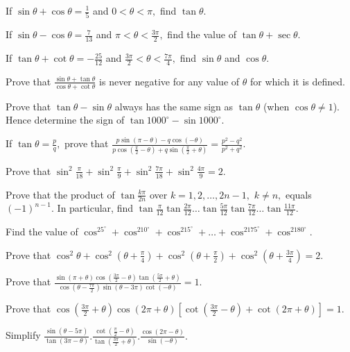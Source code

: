 \item If $\sin\theta + \cos\theta = \frac{1}{5}$ and $0 < \theta < \pi,$ find $\tan\theta.$
\item If $\sin\theta - \cos\theta = \frac{7}{13}$ and $\pi < \theta < \frac{3\pi}{2},$ find the value of $\tan\theta +
  \sec\theta.$
\item If $\tan\theta + \cot\theta = -\frac{25}{12}$ and $\frac{3\pi}{2} < \theta < \frac{7\pi}{4},$ find $\sin\theta$ and
  $\cos\theta.$
\item Prove that $\frac{\sin\theta + \tan\theta}{\cos\theta + \cot\theta}$ is never negative for any value of $\theta$ for which
  it is defined.
\item Prove that $\tan\theta - \sin\theta$ always has the same sign as $\tan\theta$ (when $\cos\theta \neq 1$). Hence determine
  the sign of $\tan 1000^\circ - \sin 1000^\circ.$
\item If $\tan\theta = \frac{p}{q},$ prove that $\frac{p\sin(\pi - \theta) - q\cos(-\theta)}{p\cos\left(\frac{\pi}{2} -
    \theta\right) + q\sin\left(\frac{\pi}{2} + \theta\right)} = \frac{p^2 - q^2}{p^2 + q^2}.$
\item Prove that $\sin^2\frac{\pi}{18} + \sin^2\frac{\pi}{9} + \sin^2\frac{7\pi}{18} + \sin^2\frac{4\pi}{9} = 2.$
\item Prove that the product of $\tan\frac{k\pi}{2n}$ over $k = 1, 2, \ldots, 2n - 1,$ $k \neq n,$ equals $(-1)^{n - 1}.$ In
  particular, find $\tan\frac{\pi}{12}\tan\frac{2\pi}{12}\ldots\tan\frac{5\pi}{12}\tan\frac{7\pi}{12}\ldots\tan\frac{11\pi}{12}.$
\item Find the value of $\cos^25^\circ + \cos^210^\circ + \cos^215^\circ + \ldots + \cos^2175^\circ + \cos^2180^\circ.$
\item Prove that $\cos^2\theta + \cos^2\left(\theta + \frac{\pi}{4}\right) + \cos^2\left(\theta + \frac{\pi}{2}\right) +
  \cos^2\left(\theta + \frac{3\pi}{4}\right) = 2.$
\item Prove that $\frac{\sin(\pi + \theta)\cos\left(\frac{3\pi}{2} - \theta\right)\tan\left(\frac{5\pi}{2} +
    \theta\right)}{\cos\left(\theta - \frac{7\pi}{2}\right)\sin(\theta - 3\pi)\cot(-\theta)} = 1.$
\item Prove that $\cos\left(\frac{3\pi}{2} + \theta\right)\cos(2\pi + \theta)\left[\cot\left(\frac{3\pi}{2} - \theta\right) +
  \cot(2\pi + \theta)\right] = 1.$
\item Simplify $\frac{\sin(\theta - 5\pi)}{\tan(3\pi - \theta)}.\frac{\cot\left(\frac{\pi}{2} -
    \theta\right)}{\tan\left(\frac{3\pi}{2} + \theta\right)}.\frac{\cos(2\pi - \theta)}{\sin(-\theta)}.$
